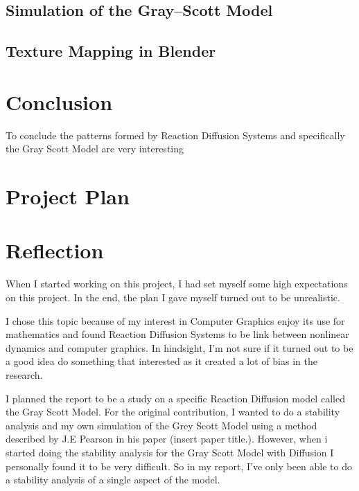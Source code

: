 \documentclass[a4paper, 11pt]{article}
\begin{document}
\subsection{Simulation of the Gray--Scott Model}
\label{sec:parameter-map}
\label{sec:numerical}
\subsection{Texture Mapping in Blender}



\section{Conclusion}
\label{sec:conclusion}
To conclude the patterns formed by Reaction Diffusion Systems and specifically the Gray Scott Model are very interesting

\printbibliography

\section{Project Plan}

\section{Reflection}
When I started working on this project, I had set myself some high expectations on this project. In the end, the plan I gave myself turned out to be unrealistic. 

I chose this topic because of my interest in Computer Graphics enjoy its use for mathematics and found Reaction Diffusion Systems to be link between nonlinear dynamics and computer graphics. In hindsight, I'm not sure if it turned out to be a good idea do something that interested as it created a lot of bias in the research.   

I planned the report to be a study on a specific Reaction Diffusion model called the Gray Scott Model. For the original contribution, I wanted to do a stability analysis and my own simulation of the Grey Scott Model using a method described by J.E Pearson in his paper (insert paper title.). However, when i started doing the stability analysis for the Gray Scott Model with Diffusion I personally found it to be very difficult. So in my report, I’ve only been able to do a stability analysis of a single aspect of the model. 
\end{document}
